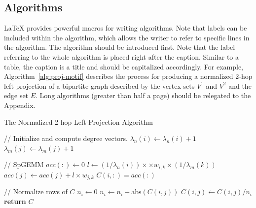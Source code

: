 \subsection{Algorithms}\label{sec:latex:algorithms}


LaTeX provides powerful macros for writing algorithms. Note that labels can be included within the algorithm, which allows the writer to refer to specific lines in the algorithm. The algorithm should be introduced first. Note that the label referring to the whole algorithm is placed right after the caption. Similar to a table, the caption is a title and should be capitalized accordingly. For example, Algorithm~\ref{alg:proj-motif} describes the process for producing a normalized 2-hop left-projection of a bipartite graph described by the vertex sets $V^1$ and $V^2$ and the edge set $E$. Long algorithms (greater than half a page) should be relegated to the Appendix.

\begin{algorithm}
\caption{The Normalized 2-hop Left-Projection Algorithm}\label{alg:proj-motif}
\small
\begin{algorithmic}[1]
\item[] \quad\; // Initialize and compute degree vectors.
 
\State $\lambda_n(i) \gets \lambda_n(i) + 1$
\State $\lambda_m(j) \gets \lambda_m(j) + 1$
\EndFor
\item[] \quad\; // SpGEMM
 \label{alg:proj-motif-spgemm1}
\State $acc(:) \gets 0$ 
\State $l \gets  (1/\lambda_n(i)) \times \times w_{i,k} \times (1/\lambda_m(k))$ \label{alg:proj-motif-lk}
 
\State $acc(j) \gets acc(j) + l \times w_{j,k}$ \label{alg:proj-motif-accum}
\EndIf
\EndFor
\EndFor
\State $C(i,:) = acc(:)$
\EndFor\label{alg:proj-motif-spgemm2}
\item[] \quad\; // Normalize rows of $C$
\label{alg:proj-motif-norm1}
\State $n_i \gets 0$
\State $n_i \gets n_i + \text{abs}(C(i,j))$
\EndFor
{}
\State $C(i,j) \gets C(i,j) / n_i$
\EndFor
\EndFor\label{alg:proj-motif-norm2}
\State \textbf{return} $C$
\EndProcedure
\end{algorithmic}
\end{algorithm}

